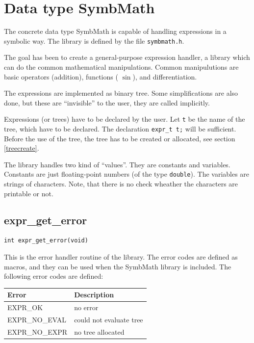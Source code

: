\newpage
\section{Data type SymbMath}
\label{symbmath}
The concrete data type SymbMath is capable of handling expressions in 
a symbolic way. The library is defined by the file {\tt symbmath.h}. 

The goal has been to create a general-purpose expression handler, \ie
a library which can do the common mathematical manipulations. Common
manipulutions are basic operators (\eg addition), functions (\eg
$\sin$), and differentiation.

The expressions are  implemented as binary tree. Some simplifications 
are also done, but these are ``invisible'' to the user, \ie they are 
called implicitly. 

Expressions (or trees) have to be declared by the user. Let {\tt t} 
be the name of the tree, which have to be declared. The declaration 
{\tt expr\_t t;} will be sufficient. Before
the use of the tree, the tree has to be created or allocated, see
section \ref{treecreate}. 

The library handles two kind of ``values''. They are constants and
variables. Constants are just 
floating-point numbers (of the type {\tt double}). The variables are
strings of characters. 
Note, that there is no check wheather the characters are printable or
not. 

\subsection{expr\_get\_error}
\begin{verbatim}
int expr_get_error(void)
\end{verbatim}

This is the error handler routine of the library. The error codes are 
defined as macros, and they can
be used when the SymbMath library is included. The following error 
codes are defined:

\vspace{0.2cm}
\begin{center}
\begin{tabular}{ll}
\hline
  Error           & Description \\ \hline 
  EXPR\_OK        & no error    \\ 
  EXPR\_NO\_EVAL  & could not evaluate tree \\ 
  EXPR\_NO\_EXPR  & no tree allocated \\
\hline
\end{tabular}
\end{center}
\vspace{0.2cm}

